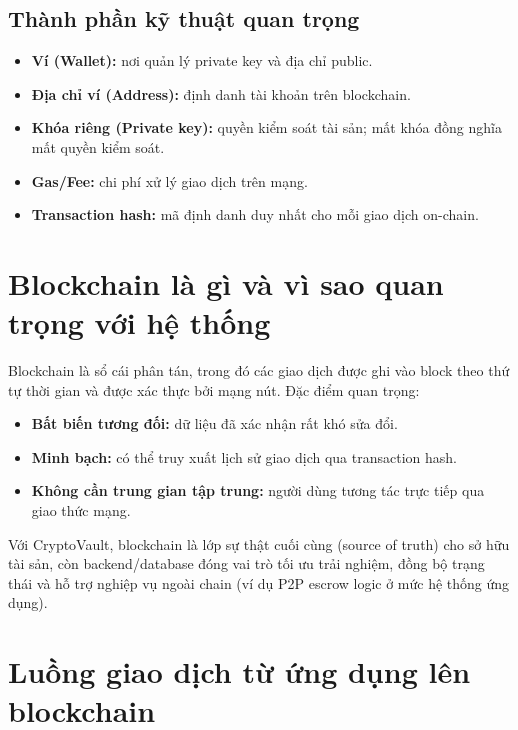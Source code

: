 \documentclass[a4paper,12pt]{report}
\begin{document}
\subsection{Thành phần kỹ thuật quan trọng}
\begin{itemize}
    \item \textbf{Ví (Wallet):} nơi quản lý private key và địa chỉ public.
    \item \textbf{Địa chỉ ví (Address):} định danh tài khoản trên blockchain.
    \item \textbf{Khóa riêng (Private key):} quyền kiểm soát tài sản; mất khóa đồng nghĩa mất quyền kiểm soát.
    \item \textbf{Gas/Fee:} chi phí xử lý giao dịch trên mạng.
    \item \textbf{Transaction hash:} mã định danh duy nhất cho mỗi giao dịch on-chain.
\end{itemize}

\section{Blockchain là gì và vì sao quan trọng với hệ thống}
Blockchain là sổ cái phân tán, trong đó các giao dịch được ghi vào block theo thứ tự thời gian và được xác thực bởi mạng nút. Đặc điểm quan trọng:
\begin{itemize}
    \item \textbf{Bất biến tương đối:} dữ liệu đã xác nhận rất khó sửa đổi.
    \item \textbf{Minh bạch:} có thể truy xuất lịch sử giao dịch qua transaction hash.
    \item \textbf{Không cần trung gian tập trung:} người dùng tương tác trực tiếp qua giao thức mạng.
\end{itemize}

Với CryptoVault, blockchain là lớp sự thật cuối cùng (source of truth) cho sở hữu tài sản, còn backend/database đóng vai trò tối ưu trải nghiệm, đồng bộ trạng thái và hỗ trợ nghiệp vụ ngoài chain (ví dụ P2P escrow logic ở mức hệ thống ứng dụng).

\section{Luồng giao dịch từ ứng dụng lên blockchain}
\end{document}
